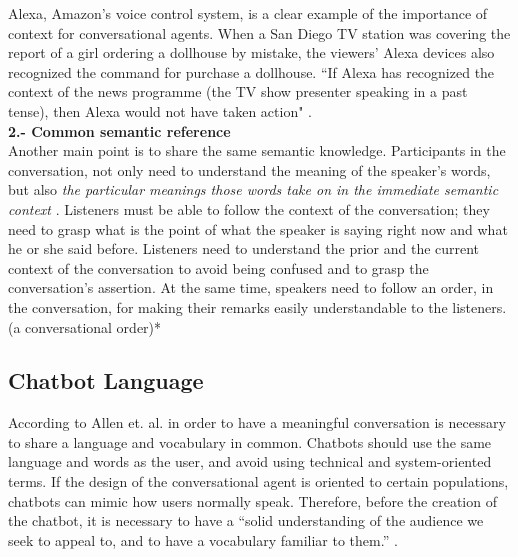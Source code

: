 \documentclass[a4paper,10pt]{article}
\begin{document}
Alexa, Amazon's voice control system, is a clear example of the importance of context for conversational agents. When  a San Diego TV station was covering the report of a girl ordering a dollhouse by mistake, the viewers' Alexa devices also recognized the command for purchase a dollhouse. ``If Alexa has recognized the context of the news programme (the TV show presenter speaking in a past tense), then Alexa would not have taken action" \cite{WhatwecanlearnfromAlexasmistakes}.\\[0\baselineskip]

\textbf{2.-  Common semantic reference} \\[0\baselineskip]
Another main point is to share the same semantic knowledge. Participants in the conversation, not only need to understand the meaning of the speaker's words, but also \textit{the particular meanings those words take on in the immediate semantic context} \cite{reichman1985getting}. 
Listeners must be able to follow the context of the conversation; they need to grasp what is the point of what the speaker is saying right now and what he or she said before. Listeners need to understand the prior and the current context of the conversation to avoid being confused and to grasp the conversation's assertion. At the same time, speakers need to follow an order, in the conversation, for making their remarks easily understandable to the listeners. (a conversational order)*

\subsection*{Chatbot Language}
According to Allen et. al. \cite{allen1978conversation} in order to have a meaningful conversation is necessary to share a language and vocabulary in common. Chatbots should use the same language and words as the user, and avoid using technical and system-oriented terms. If the design of the conversational agent is oriented to certain populations, chatbots can mimic how users normally speak.  Therefore, before the creation of the chatbot, it is necessary to have a ``solid understanding of the audience we seek to appeal to, and to have a vocabulary familiar to them.”  \cite{HeuristicsWebPage}. 
\end{document}
